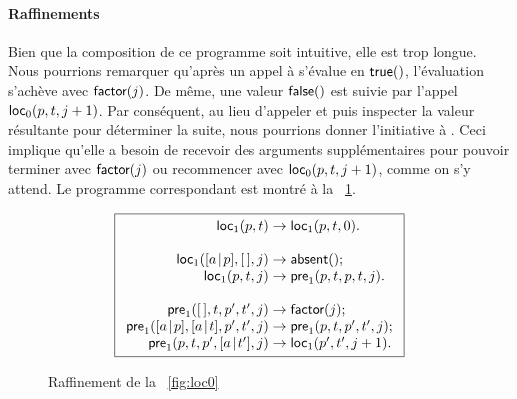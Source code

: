 \paragraph{Raffinements}

Bien que la composition de ce programme soit intuitive, elle est trop
longue. Nous pourrions remarquer qu'après un appel à
 s'évalue en \(\textsf{true}()\),
l'évaluation s'achève avec \(\textsf{factor}(j)\). De même, une valeur
\(\textsf{false}()\) est suivie par l'appel
\(\textsf{loc}_0(p,t,j+1)\). Par
conséquent, au lieu d'appeler  et puis inspecter la valeur
résultante pour déterminer la suite, nous pourrions donner
l'initiative à . Ceci implique qu'elle a besoin de recevoir
des arguments supplémentaires pour pouvoir terminer avec
\(\textsf{factor}(j)\) ou recommencer avec \(\textsf{loc}_0(p,t,j+1)\),
comme on s'y attend. Le programme correspondant est montré à la
\fig~\ref{fig:loc1}.
\begin{figure}[t]
\begin{equation*}
\boxed{%
\begin{array}{r@{\;}l@{\;}l}
\fun{loc}_1(p,t)   & \rightarrow & \fun{loc}_1(p,t,0).\\
\\
\fun{loc}_1(\cons{a}{p},\el,j) & \rightarrow & \fun{absent}();\\
\fun{loc}_1(p,t,j) & \rightarrow & \fun{pre}_1(p,t,p,t,j).\\
\\
\fun{pre}_1(\el,t,p',t',j) & \rightarrow & \fun{factor}(j);\\
\fun{pre}_1(\cons{a}{p},\cons{a}{t},p',t',j)
                   & \rightarrow & \fun{pre}_1(p,t,p',t',j);\\
\fun{pre}_1(p,t,p',\cons{a}{t'},j) & \rightarrow & \fun{loc}_1(p',t',j+1).
\end{array}}
\end{equation*}
\caption{Raffinement de la \fig~\vref{fig:loc0}}
\label{fig:loc1}
\end{figure}


